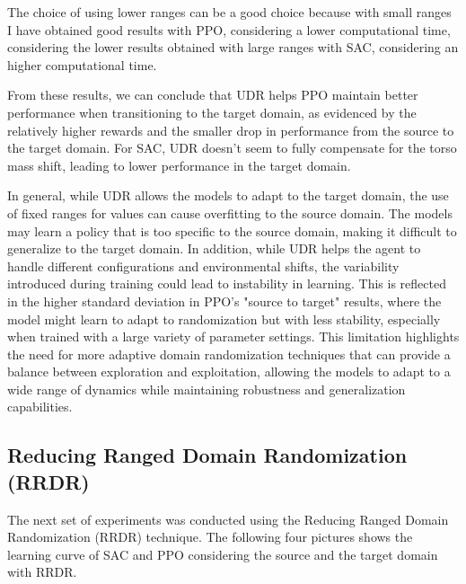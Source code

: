 \documentclass[11pt]{article}
\begin{document}
The choice of using lower ranges can be a good choice because with small ranges I have obtained good results with PPO, considering a lower computational time, considering the lower results obtained with large ranges with SAC, considering an higher computational time.

From these results, we can conclude that UDR helps PPO maintain better performance when transitioning to the target domain, as evidenced by the relatively higher rewards and the smaller drop in performance from the source to the target domain. For SAC, UDR doesn't seem to fully compensate for the torso mass shift, leading to lower performance in the target domain.

In general, while UDR allows the models to adapt to the target domain, the use of fixed ranges for values can cause overfitting to the source domain. The models may learn a policy that is too specific to the source domain, making it difficult to generalize to the target domain. In addition, while UDR helps the agent to handle different configurations and environmental shifts, the variability introduced during training could lead to instability in learning. This is reflected in the higher standard deviation in PPO’s "source to target" results, where the model might learn to adapt to randomization but with less stability, especially when trained with a large variety of parameter settings. This limitation highlights the need for more adaptive domain randomization techniques that can provide a balance between exploration and exploitation, allowing the models to adapt to a wide range of dynamics while maintaining robustness and generalization capabilities.

\subsection{Reducing Ranged Domain Randomization (RRDR)}

The next set of experiments was conducted using the Reducing Ranged Domain Randomization (RRDR) technique. The following four pictures shows the learning curve of SAC and PPO considering the source and the target domain with RRDR.
\end{document}
